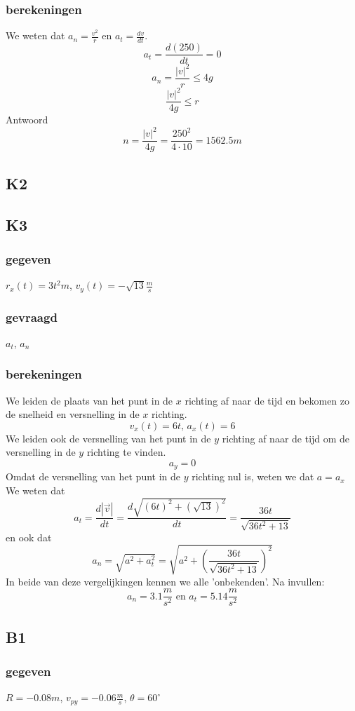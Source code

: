 \documentclass[10pt,a4paper]{article}
\begin{document}
\subsubsection*{berekeningen}
We weten dat $a_n=\frac{v^2}{r}$ en  $a_t = \frac{dv}{dt}$.
\[
a_t=\frac{d(250)}{dt} = 0
\]
\[
a_n = \frac{|v|^2}{r} \le 4g
\]
\[
\frac{|v|^2}{4g}\le r
\]
Antwoord
\[
n= \frac{|v|^2}{4g} = \frac{250^2}{4 \cdot 10} = 1562.5m
\]

\subsection{K2}

\subsection{K3}
\subsubsection*{gegeven}
$r_{x}(t) = 3t^{2} m$, 
$v_{y}(t)= -\sqrt{13} \frac{m}{s}$
\subsubsection*{gevraagd}
$a_{t}$, $a_{n}$
\subsubsection*{berekeningen}
We leiden de plaats van het punt in de $x$ richting af naar de tijd en bekomen zo de snelheid en versnelling in de $x$ richting.
\[v_{x}(t)=6t\text{, }a_{x}(t) = 6\]
We leiden ook de versnelling van het punt in de $y$ richting af naar de tijd om de versnelling in de $y$ richting te vinden.
\[
a_{y} = 0
\]
Omdat de versnelling van het punt in de $y$ richting nul is, weten we dat $a = a_{x}$
\\We weten dat
\[
a_{t} = \frac{d|\vec{v}|}{dt} = \frac{d\sqrt{(6t)^{2} + (\sqrt{13})^{2}}}{dt} = \frac{36t}{\sqrt{36t^{2}+13}}
\]
en ook dat
\[
a_{n} = \sqrt{a^{2} + a_{t}^{2}} = \sqrt{a^{2} + \left(\frac{36t}{\sqrt{36t^{2}+13}}\right)^{2}}
\]
In beide van deze vergelijkingen kennen we alle 'onbekenden'. Na invullen:
\[
a_{n} = 3.1\frac{m}{s^{2}} \text{ en } a_{t} = 5.14\frac{m}{s^{2}}
\]

\subsection{B1}
\subsubsection*{gegeven}
$R=-0.08m$, $v_{py} = -0.06 \frac{m}{s}$, $\theta = 60^\circ$
\end{document}
